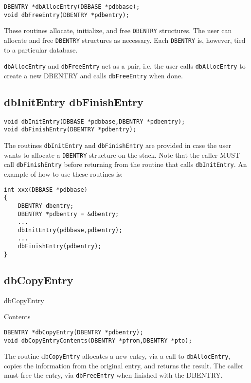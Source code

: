 \begin{verbatim}DBENTRY *dbAllocEntry(DBBASE *pdbbase);
void dbFreeEntry(DBENTRY *pdbentry);
\end{verbatim}
These routines allocate, initialize, and free \verb|DBENTRY| structures. The user can allocate and free \verb|DBENTRY| structures as 
necessary. Each \verb|DBENTRY| is, however, tied to a particular database.

\verb|dbAllocEntry| and \verb|dbFreeEntry| act as a pair, i.e. the user calls \verb|dbAllocEntry| to create a new DBENTRY and 
calls \verb|dbFreeEntry| when done.

\subsection{dbInitEntry dbFinishEntry}

\begin{verbatim}void dbInitEntry(DBBASE *pdbbase,DBENTRY *pdbentry);
void dbFinishEntry(DBENTRY *pdbentry);
\end{verbatim}
The routines \verb|dbInitEntry| and \verb|dbFinishEntry| are provided in case the user wants to allocate a \verb|DBENTRY| structure 
on the stack. Note that the caller MUST call \verb|dbFinishEntry| before returning from the routine that calls 
\verb|dbInitEntry|. An example of how to use these routines is:

\begin{verbatim}int xxx(DBBASE *pdbbase)
{
    DBENTRY dbentry;
    DBENTRY *pdbentry = &dbentry;
    ...
    dbInitEntry(pdbbase,pdbentry);
    ...
    dbFinishEntry(pdbentry);
}

\end{verbatim}\subsection{dbCopyEntry}

dbCopyEntry

Contents

\begin{verbatim}DBENTRY *dbCopyEntry(DBENTRY *pdbentry);
void dbCopyEntryContents(DBENTRY *pfrom,DBENTRY *pto);
\end{verbatim}
The routine d\verb|bCopyEntry| allocates a new entry, via a call to \verb|dbAllocEntry|, copies the information from the original 
entry, and returns the result. The caller must free the entry, via \verb|dbFreeEntry| when finished with the DBENTRY.

